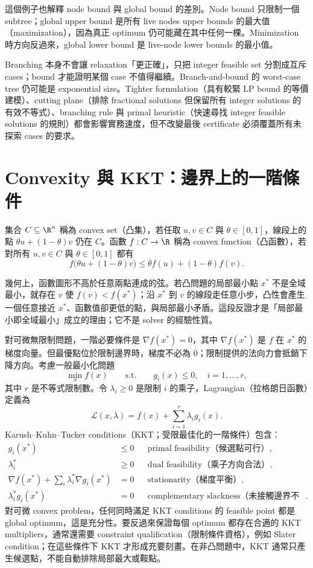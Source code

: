 \documentclass[11pt,a4paper,oneside,openany]{book}
\begin{document}
這個例子也解釋 node bound 與 global bound 的差別。Node bound 只限制一個 subtree；global upper bound 是所有 live nodes upper bounds 的最大值（maximization），因為真正 optimum 仍可能藏在其中任何一棵。Minimization 時方向反過來，global lower bound 是 live-node lower bounds 的最小值。

\begin{misconception}
Branching 本身不會讓 relaxation「更正確」，只把 integer feasible set 分割成互斥 cases；bound 才能證明某個 case 不值得繼續。Branch-and-bound 的 worst-case tree 仍可能是 exponential size。Tighter formulation（具有較緊 LP bound 的等價建模）、cutting plane（排除 fractional solutions 但保留所有 integer solutions 的有效不等式）、branching rule 與 primal heuristic（快速尋找 integer feasible solutions 的規則）都會影響實務速度，但不改變最後 certificate 必須覆蓋所有未探索 cases 的要求。
\end{misconception}

\section{Convexity 與 KKT：邊界上的一階條件}
\begin{definition}
集合 $C\subseteq\R^n$ 稱為 convex set（凸集），若任取 $u,v\in C$ 與 $\theta\in[0,1]$，線段上的點 $\theta u+(1-\theta)v$ 仍在 $C$。函數 $f:C\to\R$ 稱為 convex function（凸函數），若對所有 $u,v\in C$ 與 $\theta\in[0,1]$ 都有
\[
 f\bigl(\theta u+(1-\theta)v\bigr)
 \le \theta f(u)+(1-\theta)f(v).
\]
\end{definition}
幾何上，函數圖形不高於任意兩點連成的弦。若凸問題的局部最小點 $x^*$ 不是全域最小，就存在 $v$ 使 $f(v)<f(x^*)$；沿 $x^*$ 到 $v$ 的線段走任意小步，凸性會產生一個任意接近 $x^*$、函數值卻更低的點，與局部最小矛盾。這段反證才是「局部最小即全域最小」成立的理由；它不是 solver 的經驗性質。

對可微無限制問題，一階必要條件是 $\nabla f(x^*)=0$，其中 $\nabla f(x^*)$ 是 $f$ 在 $x^*$ 的梯度向量。但最優點位於限制邊界時，梯度不必為 0；限制提供的法向力會抵銷下降方向。考慮一般最小化問題
\[
 \min_x f(x)\qquad\text{s.t.}\qquad g_i(x)\le0,\quad i=1,\ldots,r,
\]
其中 $r$ 是不等式限制數。令 $\lambda_i\ge0$ 是限制 $i$ 的乘子，Lagrangian（拉格朗日函數）定義為
\[
 \mathcal L(x,\lambda)=f(x)+\sum_{i=1}^{r}\lambda_i g_i(x).
\]
Karush--Kuhn--Tucker conditions（KKT；受限最佳化的一階條件）包含：
\begin{align*}
g_i(x^*)&\le0 &&\text{primal feasibility（候選點可行）},\\
\lambda_i^*&\ge0 &&\text{dual feasibility（乘子方向合法）},\\
\nabla f(x^*)+\sum_i\lambda_i^*\nabla g_i(x^*)&=0
  &&\text{stationarity（梯度平衡）},\\
\lambda_i^*g_i(x^*)&=0 &&\text{complementary slackness（未接觸邊界不施力）}.
\end{align*}
對可微 convex problem，任何同時滿足 KKT conditions 的 feasible point 都是 global optimum，這是充分性。要反過來保證每個 optimum 都存在合適的 KKT multipliers，通常還需要 constraint qualification（限制條件資格），例如 Slater condition；在這些條件下 KKT 才形成充要刻畫。在非凸問題中，KKT 通常只產生候選點，不能自動排除局部最大或鞍點。
\end{document}
